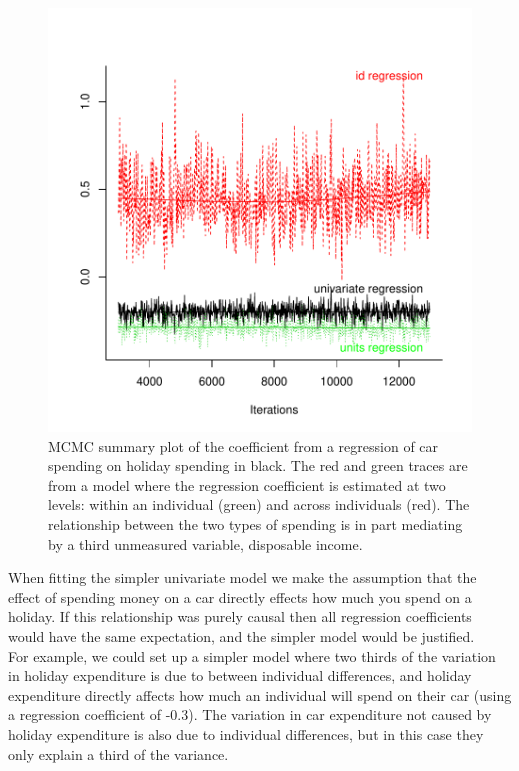 \documentclass{article}
\begin{document}
\iftalk
\else
\fi


\begin{figure}[!h]
\begin{center}
\includegraphics{Lecture5-011}
\end{center}
\caption{MCMC summary plot of the coefficient from a regression of car spending on holiday spending in black. The red and green traces are from a model where the regression coefficient is estimated at two levels: within an individual (green) and across individuals (red). The relationship between the two types of spending is in part mediating by a third unmeasured variable, disposable income.}
\label{asUV-fig}
\end{figure}

When fitting the simpler univariate model we make the assumption that the effect of spending money on a car directly effects how much you spend on a holiday. If this relationship was purely causal then all regression coefficients would have the same expectation, and the simpler model would be justified.\\

For example, we could set up a simpler model where two thirds of the variation in holiday expenditure is due to between individual differences, and holiday expenditure directly affects how much an individual will spend on their car (using a regression coefficient of -0.3). The variation in car expenditure not caused by holiday expenditure is also due to individual differences, but in this case they only explain a third of the variance.  
\end{document}
